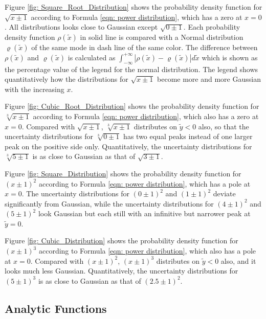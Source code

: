 \documentclass[twoside]{article}
\numberwithin{equation}{section}
\begin{document}
Figure \ref{fig: Square_Root_Distribution} shows the probability density function for $\sqrt{x \pm 1}$ according to Formula \eqref{eqn: power distribution}, which has a zero at $x=0$.
All distributions looks close to Gaussian except $\sqrt{0 \pm 1}$.
Each probability density function $\rho(\tilde{x})$ in solid line is compared with a Normal distribution $\varrho(\tilde{x})$ of the same mode in dash line of the same color.
The difference between $\rho(\tilde{x})$ and $\varrho(\tilde{x})$ is calculated as $\int_{-\infty}^{+\infty} |\rho(\tilde{x}) - \varrho(\tilde{x})| d \tilde{x}$ which is shown as the percentage value of the legend for the normal distribution.
The legend shows quantitatively how the distributions for $\sqrt{x \pm 1}$ become more and more Gaussian with the increasing $x$.

Figure \ref{fig: Cubic_Root_Distribution} shows the probability density function for $\sqrt[3]{x \pm 1}$ according to Formula \eqref{eqn: power distribution}, which also has a zero at $x=0$.
Compared with $\sqrt{x \pm 1}$, $\sqrt[3]{x \pm 1}$ distributes on $\tilde{y} < 0$ also, so that the uncertainty distributions for $\sqrt[3]{0 \pm 1}$ has two equal peaks instead of one larger peak on the positive side only.
Quantitatively, the uncertainty distributions for $\sqrt[3]{5 \pm 1}$ is as close to Gaussian as that of $\sqrt{3 \pm 1}$.

Figure \ref{fig: Square_Distribution} shows the probability density function for $(x \pm 1)^2$ according to Formula \eqref{eqn: power distribution}, which has a pole at $x=0$.
The uncertainty distributions for $(0 \pm 1)^2$ and $(1 \pm 1)^2$ deviate significantly from Gaussian, while the uncertainty distributions for $(4 \pm 1)^2$ and $(5 \pm 1)^2$ look Gaussian but each still with an infinitive but narrower peak at $\tilde{y} = 0$.

Figure \ref{fig: Cubic_Distribution} shows the probability density function for $(x \pm 1)^3$ according to Formula \eqref{eqn: power distribution}, which also has a pole at $x=0$.
Compared with $(x \pm 1)^2$, $(x \pm 1)^3$ distributes on $\tilde{y} < 0$ also, and it looks much less Gaussian.
Quantitatively, the uncertainty distributions for $(5 \pm 1)^3$ is as close to Gaussian as that of $(2.5 \pm 1)^2$.






\subsection{Analytic Functions}
\end{document}
